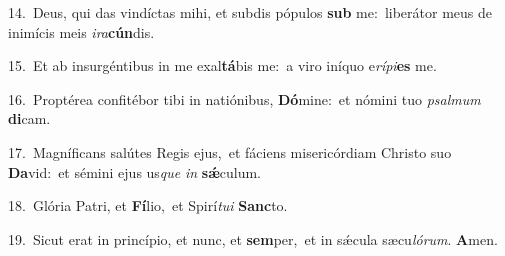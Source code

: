 {\numbfont\textcolor{\numbcolor}{14.}}~Deus, qui das vindíctas mihi, et subdis pópulos \textbf{sub} me:~\star liberátor meus de inimícis meis \textit{i}\-\textit{ra}\textbf{cún}dis.\par
{\numbfont\textcolor{\numbcolor}{15.}}~Et ab insurgéntibus in me exal\-\textbf{tá}\-bis me:~\star a viro iníquo e\-\textit{rí}\-\textit{pi}\textbf{es} me.\par
{\numbfont\textcolor{\numbcolor}{16.}}~Proptérea confitébor tibi in natiónibus, \textbf{Dó}\-mine:~\star et nómini tuo \textit{psal}\-\textit{mum} \textbf{di}\-cam.\par
{\numbfont\textcolor{\numbcolor}{17.}}~Magníficans salútes Regis ejus,~\dagger et fáciens misericórdiam Christo suo \textbf{Da}\-vid:~\star et sémini ejus us\textit{que} \textit{in} \textbf{sǽ}\-culum.\par
{\numbfont\textcolor{\numbcolor}{18.}}~Glória Patri, et \textbf{Fí}\-lio,~\star et Spirí\-\textit{tu}\-\textit{i} \textbf{Sanc}\-to.\par
{\numbfont\textcolor{\numbcolor}{19.}}~Sicut erat in princípio, et nunc, et \textbf{sem}\-per,~\star et in sǽcula sæcu\-\textit{ló}\-\textit{rum}. \textbf{A}\-men.\par
